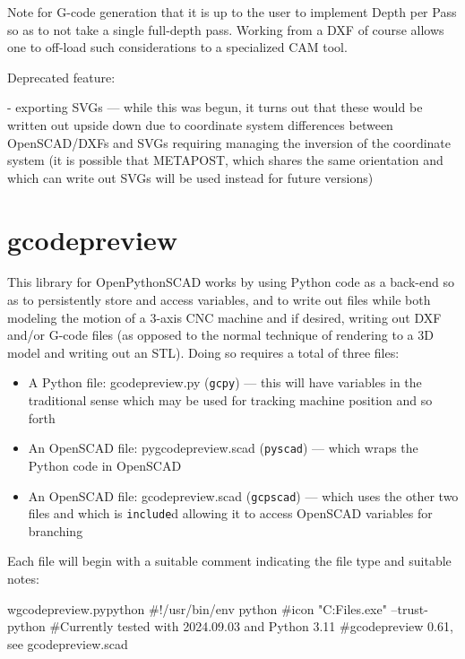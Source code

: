 \documentclass{ltxdoc}
\begin{document}
\begin{readme}
Note for G-code generation that it is up to the user 
to implement Depth per Pass so as to not take a 
single full-depth pass. Working from a DXF of course 
allows one to off-load such considerations to a 
specialized CAM tool.

Deprecated feature:

 - exporting SVGs --- while this was begun, it turns out that these would be written out upside down due to coordinate system differences between OpenSCAD/DXFs and SVGs requiring managing the inversion of the coordinate system (it is possible that METAPOST, which shares the same orientation and which can write out SVGs will be used instead for future versions)

\end{readme}

\clearpage
\section{gcodepreview}

This library for OpenPythonSCAD works by using Python code as a back-end so as to persistently store 
and access variables, and to write out files while both modeling the motion of a 3-axis CNC machine
and if desired, writing out DXF and/or G-code files (as opposed to the normal technique of 
rendering to a 3D model and writing out an STL). Doing so requires a total of three files:

\begin{itemize}
\item A Python file: gcodepreview.py (\texttt{gcpy}) --- this will have variables in the 
      traditional sense which may be used for tracking machine position and so forth
\item An OpenSCAD file: pygcodepreview.scad (\texttt{pyscad}) --- which wraps the Python code 
      in OpenSCAD
\item An OpenSCAD file: gcodepreview.scad (\texttt{gcpscad}) --- which uses the other two files 
      and which is \texttt{include}d allowing it to access OpenSCAD variables for branching   
\end{itemize}
 
Each file will begin with a suitable comment indicating the file type and suitable notes:

\begin{writecode}{w}{gcodepreview.py}{python}
#!/usr/bin/env python
#icon "C:\Program Files\PythonSCAD\bin\openscad.exe"  --trust-python
#Currently tested with 2024.09.03 and Python 3.11
#gcodepreview 0.61, see gcodepreview.scad

\end{writecode}
\addtocounter{gcpy}{6}
\end{document}
